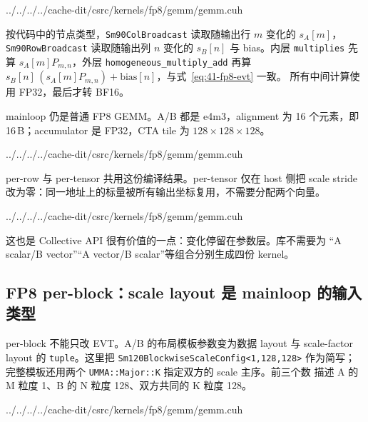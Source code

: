 \begin{lstinputlisting}[linerange={145-155},firstnumber=auto,
  title={cache-dit fp8/gemm/gemm.cuh L145--155（scale + bias 的 EVT）}]{../../../../cache-dit/csrc/kernels/fp8/gemm/gemm.cuh}
\end{lstinputlisting}

按代码中的节点类型，\texttt{Sm90ColBroadcast} 读取随输出行 $m$ 变化的
$s_A[m]$，\texttt{Sm90RowBroadcast} 读取随输出列 $n$ 变化的 $s_B[n]$ 与
bias。内层 \texttt{multiplies} 先算 $s_A[m]P_{m,n}$，外层
\texttt{homogeneous\_multiply\_add} 再算
$s_B[n]\,(s_A[m]P_{m,n})+\mathrm{bias}[n]$，与式~\ref{eq:41-fp8-evt} 一致。
所有中间计算使用 FP32，最后才转 BF16。

mainloop 仍是普通 FP8 GEMM。A/B 都是 e4m3，alignment 为 16 个元素，即
16\,B；accumulator 是 FP32，CTA tile 为 $128\times128\times128$。

\begin{lstinputlisting}[linerange={363-376},firstnumber=auto,
  title={cache-dit fp8/gemm/gemm.cuh L363--376（FP8 row/tensor Builder）}]{../../../../cache-dit/csrc/kernels/fp8/gemm/gemm.cuh}
\end{lstinputlisting}

per-row 与 per-tensor 共用这份编译结果。per-tensor 仅在 host 侧把 scale
stride 改为零：同一地址上的标量被所有输出坐标复用，不需要分配两个向量。

\begin{lstinputlisting}[linerange={504-518},firstnumber=auto,
  title={cache-dit fp8/gemm/gemm.cuh L504--518（零 stride 广播与参数组装）}]{../../../../cache-dit/csrc/kernels/fp8/gemm/gemm.cuh}
\end{lstinputlisting}

这也是 Collective API 很有价值的一点：变化停留在参数层。库不需要为
“A scalar/B vector”“A vector/B scalar”等组合分别生成四份 kernel。

\subsection{FP8 per-block：scale layout 是 mainloop 的输入类型}

per-block 不能只改 EVT。A/B 的布局模板参数变为数据 layout 与 scale-factor
layout 的 \texttt{tuple}。这里把
\texttt{Sm120Blockwise}\allowbreak\texttt{ScaleConfig<1,128,128>} 作为简写；
完整模板还用两个 \texttt{UMMA::Major::K} 指定双方的 scale 主序。前三个数
描述 A 的 M 粒度 1、B 的 N 粒度 128、双方共同的 K 粒度 128。

\begin{lstinputlisting}[linerange={438-458},firstnumber=auto,
  title={cache-dit fp8/gemm/gemm.cuh L438--458（blockwise scale config 与 Builder）}]{../../../../cache-dit/csrc/kernels/fp8/gemm/gemm.cuh}
\end{lstinputlisting}


